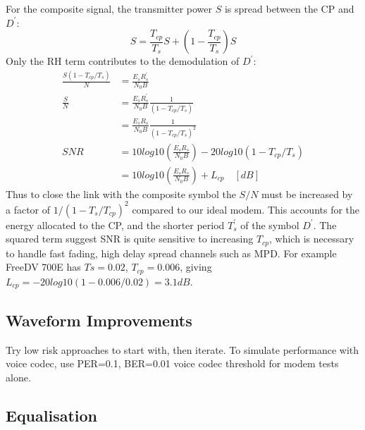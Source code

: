 \documentclass{article}
\begin{document}
For the composite signal, the transmitter power $S$ is spread between the CP and $D^\prime$: 
\begin{equation}
S = \frac{T_{cp}}{T_s}S + \left(1 - \frac{T_{cp}}{T_s} \right)S
\end{equation}
Only the RH term contributes to the demodulation of $D^\prime$:
\begin{equation}
\begin{split}
\frac{S(1-T_{cp}/T_s)}{N} &= \frac{E_sR^\prime_s}{N_0B} \\
\frac{S}{N} &= \frac{E_sR^\prime_s}{N_0B}\frac{1}{(1-T_{cp}/T_s)}\\
            &= \frac{E_sR_s}{N_0B}\frac{1}{(1-T_{cp}/T_s)^2} \\
SNR         &= 10log10 \left( \frac{E_sR_s}{N_0B} \right) - 20log10(1-T_{cp}/T_s) \\
            &= 10log10 \left( \frac{E_sR_s}{N_0B} \right) + L_{cp} \quad [\si{dB}]
\end{split}
\end{equation}
Thus to close the link with the composite symbol the $S/N$ must be increased by a factor of $1/(1 - {T_s}/T_{cp})^2$ compared to our ideal modem.  This accounts for the energy allocated to the CP, and the shorter period $T^\prime_s$ of the symbol $D^\prime$.  The squared term suggest SNR is quite sensitive to increasing $T_{cp}$, which is necessary to handle fast fading, high delay spread channels such as MPD. For example FreeDV 700E has $Ts=0.02$, $T_{cp}=0.006$, giving $L_{cp}=-20log10(1-0.006/0.02)=3.1 \si{dB}$.

\subsection{Waveform Improvements}

Try low risk approaches to start with, then iterate.  To simulate performance with voice codec, use PER=0.1, BER=0.01 voice codec threshold for modem tests alone.

\subsection{Equalisation}
\end{document}
